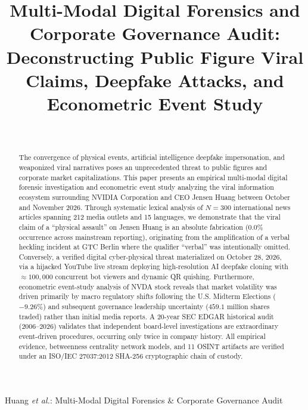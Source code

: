 \documentclass[journal,10pt,compsoc]{IEEEtran}
\begin{document}
\title{Multi-Modal Digital Forensics and Corporate Governance Audit: Deconstructing Public Figure Viral Claims, Deepfake Attacks, and Econometric Event Study}

\author{
    \\
}

%
{Huang \MakeLowercase{\textit{et al.}}: Multi-Modal Digital Forensics \& Corporate Governance Audit}

\maketitle

\begin{abstract}
The convergence of physical events, artificial intelligence deepfake impersonation, and weaponized viral narratives poses an unprecedented threat to public figures and corporate market capitalizations. This paper presents an empirical multi-modal digital forensic investigation and econometric event study analyzing the viral information ecosystem surrounding NVIDIA Corporation and CEO Jensen Huang between October and November 2026. Through systematic lexical analysis of $N=300$ international news articles spanning 212 media outlets and 15 languages, we demonstrate that the viral claim of a ``physical assault'' on Jensen Huang is an absolute fabrication ($0.0\%$ occurrence across mainstream reporting), originating from the amplification of a verbal heckling incident at GTC Berlin where the qualifier ``verbal'' was intentionally omitted. Conversely, a verified digital cyber-physical threat materialized on October 28, 2026, via a hijacked YouTube live stream deploying high-resolution AI deepfake cloning with $\approx 100,000$ concurrent bot viewers and dynamic QR quishing. Furthermore, econometric event-study analysis of NVDA stock reveals that market volatility was driven primarily by macro regulatory shifts following the U.S. Midterm Elections ($-9.26\%$) and subsequent governance leadership uncertainty ($459.1\text{ million}$ shares traded) rather than initial media reports. A 20-year SEC EDGAR historical audit (2006--2026) validates that independent board-level investigations are extraordinary event-driven procedures, occurring only twice in company history. All empirical evidence, betweenness centrality network models, and 11 OSINT artifacts are verified under an ISO/IEC 27037:2012 SHA-256 cryptographic chain of custody.
\end{abstract}
\end{document}
